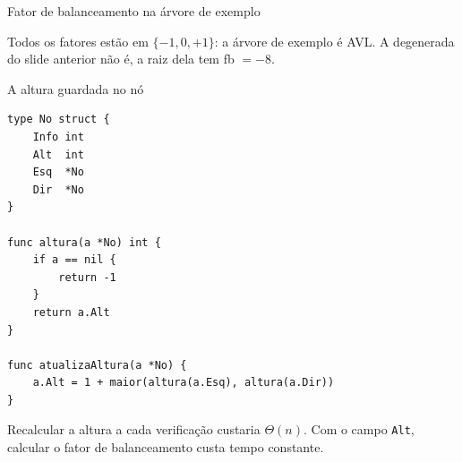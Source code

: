 \documentclass{beamer}
\begin{document}
\begin{frame}{Fator de balanceamento na árvore de exemplo}
  \begin{center}
  \end{center}

  \vspace{0.2cm}
  Todos os fatores estão em $\{-1, 0, +1\}$: a árvore de exemplo é AVL. A
  degenerada do slide anterior não é, a raiz dela tem fb $= -8$.
\end{frame}

\begin{frame}[fragile]{A altura guardada no nó}
\begin{verbatim}
type No struct {
	Info int
	Alt  int
	Esq  *No
	Dir  *No
}

func altura(a *No) int {
	if a == nil {
		return -1
	}
	return a.Alt
}

func atualizaAltura(a *No) {
	a.Alt = 1 + maior(altura(a.Esq), altura(a.Dir))
}
\end{verbatim}

  \vspace{0.2cm}
  Recalcular a altura a cada verificação custaria $\Theta(n)$. Com o campo
  \texttt{Alt}, calcular o fator de balanceamento custa tempo constante.
\end{frame}
\end{document}
